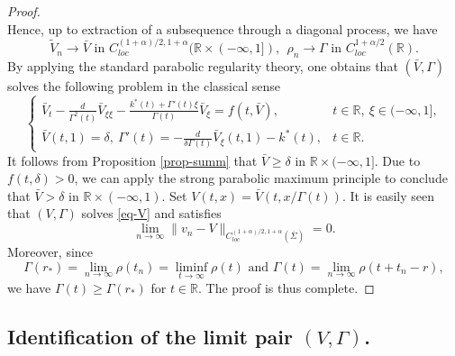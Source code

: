 \documentclass[11pt]{amsart}
\numberwithin{equation}{section}
\begin{document}
\begin{proof}
\begin{equation*}
\end{equation*}
Hence, up to extraction of a subsequence  through a diagonal process, we have 
\begin{equation*}
  \tilde{V}_n\to \bar{V} \text{ in } C^{(1+\alpha)/2, 1+\alpha}_{loc}(\mathbb R\times (-\infty,1]), ~~\rho_n\to \Gamma\text{ in } C_{loc}^{1+\alpha/2}(\mathbb R).
\end{equation*}
By applying  the standard parabolic regularity theory, one obtains that $(\bar{V}, \Gamma)$ solves the following  problem in the classical sense
\begin{equation*}
  \begin{cases}
  \bar{V}_t-\frac{d}{\Gamma^2(t)}\bar{V}_{\xi\xi}-\frac{k^*(t)+\Gamma'(t)\xi}{\Gamma(t)}\bar{V}_\xi=f(t,\bar{V}), &t\in\mathbb R,~\xi\in(-\infty,1],\\
  \bar{V}(t,1)=\delta,~ \Gamma'(t)=-\frac{d}{\delta\Gamma(t)}\bar{V}_\xi(t,1)-k^*(t), &t\in\mathbb R.
   \end{cases}
   \end{equation*}
It follows from Proposition \ref{prop-summ} that $\bar{V}\geq \delta$ in $\mathbb{R}\times (-\infty,1]$. Due to $f(t,\delta)>0$, we can apply the strong parabolic maximum principle to conclude that $\bar{V}>\delta$ in $\mathbb{R}\times (-\infty,1)$.  Set  $V(t,x)=\bar{V}(t,x/\Gamma(t))$. It is easily seen that $(V,\Gamma)$ solves \eqref{eq-V} and  satisfies
\begin{equation*}
  \lim_{n\to\infty}\|v_n-V\|_{C_{loc}^{(1+\alpha)/2,1+\alpha}(\overline\Sigma)}= 0.
\end{equation*}
Moreover, since 
\begin{equation*}
  \Gamma(r_*)=\lim_{n\to\infty} \rho(t_n)=\liminf_{t\to\infty}\rho(t) \text{ and } \Gamma(t)=\lim_{n\to\infty}\rho(t+t_n-r),
\end{equation*}
 we have  $\Gamma(t)\geq \Gamma(r_*)$ for $t\in\mathbb R$. The proof is thus complete.
\end{proof}

\subsection{Identification of  the limit pair $(V,\Gamma)$.}
\end{document}
